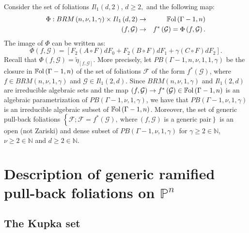 \documentclass{amsart}
\theoremstyle{definition}
\theoremstyle{proposition}
\numberwithin{equation}{section}
\theoremstyle{main}
\begin{document}
Consider the set of foliations $Il_{1}\left(d,2\right)$, $d\geq 2,$ and the following map:
\begin{eqnarray*}
\Phi:BRM\left(n,\nu,1,\gamma\right) \times Il_{1}\left(d,2\right) &\to&\mathbb{F}{\rm{ol}}\left(\Gamma-1,n\right)\\
\left(f,\mathcal G\right) &\to& f ^{\ast}\left(\mathcal G\right)=\Phi\left(f,\mathcal G\right).
\end{eqnarray*}  
The image of $\Phi$ can be written as:  $$\Phi\left(f,\mathcal G\right)=\left[F_{2}\left(A\circ F\right) dF_{0} + F_{2}\left(B\circ F\right) dF_{1} + {\gamma}\left(C\circ F\right) dF_{2}\right].$$ Recall that $\Phi\left(f,\mathcal G\right)=\tilde\eta_{[f,\mathcal G]}$. More precisely, let $PB(\Gamma-1,n,\nu,1,1,\gamma)$ be the closure in $\mathbb{F}{\rm{ol}}\left(\Gamma-1,n\right)$ of the set of foliations $\mathcal{F}$ of the form $f^*\left(\mathcal{G}\right)$, where $f\in BRM\left(n,\nu,1,\gamma\right)$ and $\mathcal G \in Il_{1}(2,d).$ Since $BRM\left(n,\nu,1,\gamma\right)$ and $Il_{1}(2,d)$ are irreducible algebraic sets and the map $\left(f,\mathcal{G}\right) \to f^*\left(\mathcal{G}\right) \in \mathbb{F}{\rm{ol}}\left(\Gamma-1,n\right)$ is an algebraic parametrization of $PB(\Gamma-1,\nu,1,\gamma)$, we have that $PB(\Gamma-1,\nu,1,\gamma)$ is an irreducible algebraic subset of $\mathbb{F}{\rm{ol}}\left(\Gamma-1,n\right)$. Moreover, the set of generic pull-back foliations $\left\{\mathcal{F}; \mathcal{F} = f^*(\mathcal{G}),\ \text{where} \ \left(f,\mathcal{G}\right)\right.$ is a generic pair$\left.\right\}$ is an open (not Zariski) and dense subset of $PB(\Gamma-1,\nu,1,\gamma)$ for $\gamma\geq2  \in \mathbb N$, $\nu\geq2  \in \mathbb N$ and $d \geq 2  \in \mathbb N$. 

\section{Description of generic ramified pull-back foliations on $\mathbb P^n$}
\subsection{The Kupka set}\label{section5.1}
\end{document}
